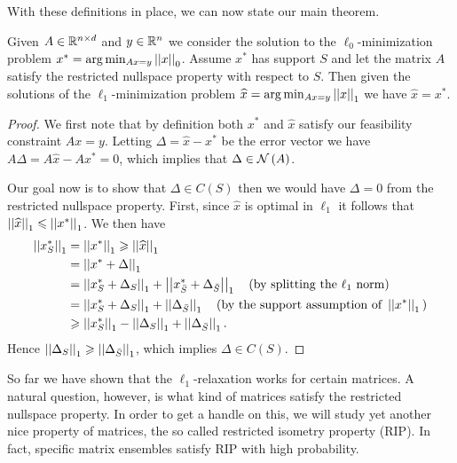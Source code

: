 \documentclass[11pt]{article}
\begin{document}
With these definitions in place, we can now state our main theorem.

\begin{theorem}
    Given \(A \in \mathbb R^{n\times d}\) and \(y\in\mathbb R^n\) we consider the solution to the \(\ell_0\)-minimization problem \(x^\ast=\arg\min_{A x=y}\left|\left|x\right|\right|_{0}\). Assume \(x^\ast\) has support \(S\) and let the matrix \(A\) satisfy the restricted nullspace property with respect to \(S\). Then given the solutions of the \(\ell_1\)-minimization problem \(\widehat{x}=\arg\min_{A x=y}\left|\left|x\right|\right|_{1}\) we have \(\widehat{x}=x^\ast\).
\end{theorem}

\begin{proof}
We first note that by definition both \(x^\ast\) and \(\widehat{x}\) satisfy our feasibility constraint \(A x=y\). Letting \(\Delta=\widehat{x}-x^\ast\) be the error vector we have \(A \Delta=A \widehat{x}-A x^\ast=0\), which implies that \(\Delta\in\mathcal N\left(A\right)\).

Our goal now is to show that \(\Delta\in C(S)\) then we would have \(\Delta=0\) from the restricted nullspace property. First, since \(\widehat{x}\) is optimal in \(\ell_1\) it follows that \(\left|\left|\widehat x\right|\right|_1\leqslant\left|\left|x^\ast\right|\right|_1\). We then have
\[\begin{aligned}
    \left|\left|x^\ast_S\right|\right|_1 &= \left|\left|x^\ast\right|\right|_1\geqslant \left|\left|\widehat x\right|\right|_1\\
    &= \left|\left|x^\ast+\Delta\right|\right|_1\\
    &= \left|\left|x^\ast_S+\Delta_S\right|\right|_1+\left|\left|x^\ast_{\bar S}+\Delta_{\bar S}\right|\right|_1\quad\textnormal{(by splitting the }\ell_1\textnormal{ norm)}\\
    &= \left|\left|x^\ast_S+\Delta_S\right|\right|_1+\left|\left|\Delta_{\bar S}\right|\right|_1\quad\textnormal{(by the support assumption of }\left|\left|x^\ast\right|\right|_1\textnormal{)}\\
    &\geqslant \left|\left|x^\ast_S\right|\right|_1-\left|\left|\Delta_S\right|\right|_1+\left|\left|\Delta_{\bar S}\right|\right|_1.
\end{aligned}\]
Hence \(\left|\left|\Delta_S\right|\right|_1\geqslant\left|\left|\Delta_{\bar S}\right|\right|_1\), which implies \(\Delta\in C(S)\).
\end{proof}

So far we have shown that the \(\ell_1\)-relaxation works for certain matrices. A natural question, however, is what kind of matrices satisfy the restricted nullspace property. In order to get a handle on this, we will study yet another nice property of matrices, the so called restricted isometry property (RIP). In fact, specific matrix ensembles satisfy RIP with high probability.
\end{document}
